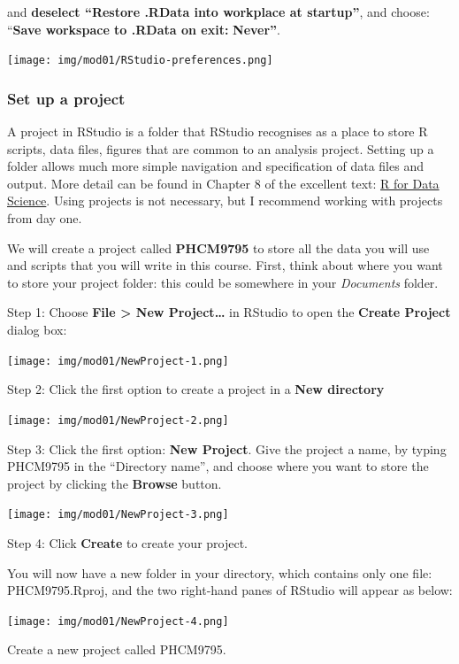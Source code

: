 \documentclass[
  a4paper,
]{memoir}
\begin{document}
and \textbf{deselect ``Restore .RData into workplace at startup''}, and
choose: ``\textbf{Save workspace to .RData on exit:} \textbf{Never''}.

\texttt{[image: img/mod01/RStudio-preferences.png]}

\hypertarget{set-up-a-project}{%
\subsubsection{Set up a project}\label{set-up-a-project}}

A project in RStudio is a folder that RStudio recognises as a place to
store R scripts, data files, figures that are common to an analysis
project. Setting up a folder allows much more simple navigation and
specification of data files and output. More detail can be found in
Chapter 8 of the excellent text:
\href{https://r4ds.had.co.nz/workflow-projects.html}{R for Data
Science}. Using projects is not necessary, but I recommend working with
projects from day one.

We will create a project called \textbf{PHCM9795} to store all the data
you will use and scripts that you will write in this course. First,
think about where you want to store your project folder: this could be
somewhere in your \emph{Documents} folder.

Step 1: Choose \textbf{File \textgreater{} New Project\ldots{}} in
RStudio to open the \textbf{Create Project} dialog box:

\texttt{[image: img/mod01/NewProject-1.png]}

Step 2: Click the first option to create a project in a \textbf{New
directory}

\texttt{[image: img/mod01/NewProject-2.png]}

Step 3: Click the first option: \textbf{New Project}. Give the project a
name, by typing PHCM9795 in the ``Directory name'', and choose where you
want to store the project by clicking the \textbf{Browse} button.

\texttt{[image: img/mod01/NewProject-3.png]}

Step 4: Click \textbf{Create} to create your project.

You will now have a new folder in your directory, which contains only
one file: PHCM9795.Rproj, and the two right-hand panes of RStudio will
appear as below:

\texttt{[image: img/mod01/NewProject-4.png]}

\begin{tcolorbox}[enhanced jigsaw, title={TASK}, opacitybacktitle=0.6, colbacktitle=quarto-callout-note-color!10!white, titlerule=0mm, colframe=quarto-callout-note-color-frame, opacityback=0, left=2mm, breakable, bottomtitle=1mm, coltitle=black, bottomrule=.15mm, arc=.35mm, rightrule=.15mm, toptitle=1mm, colback=white, toprule=.15mm, leftrule=.75mm]

Create a new project called PHCM9795.

\end{tcolorbox}
\end{document}
